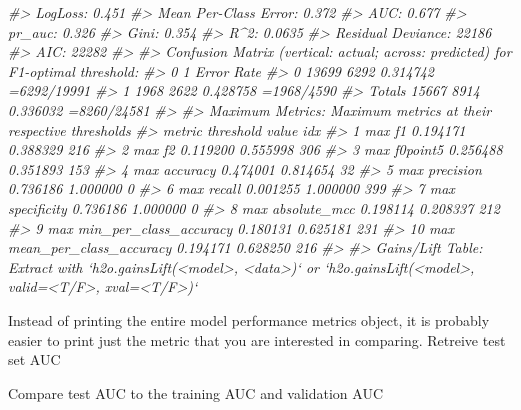 \documentclass[]{book}
\newenvironment{Shaded}{\begin{snugshade}}{\end{snugshade}}
\newcommand{\CommentTok}[1]{\textcolor[rgb]{0.56,0.35,0.01}{\textit{#1}}}
\newcommand{\KeywordTok}[1]{\textcolor[rgb]{0.13,0.29,0.53}{\textbf{#1}}}
\newcommand{\NormalTok}[1]{#1}
\begin{document}
\begin{Shaded}
\begin{Highlighting}[]
\CommentTok{#> LogLoss:  0.451}
\CommentTok{#> Mean Per-Class Error:  0.372}
\CommentTok{#> AUC:  0.677}
\CommentTok{#> pr_auc:  0.326}
\CommentTok{#> Gini:  0.354}
\CommentTok{#> R^2:  0.0635}
\CommentTok{#> Residual Deviance:  22186}
\CommentTok{#> AIC:  22282}
\CommentTok{#> }
\CommentTok{#> Confusion Matrix (vertical: actual; across: predicted) for F1-optimal threshold:}
\CommentTok{#>            0    1    Error         Rate}
\CommentTok{#> 0      13699 6292 0.314742  =6292/19991}
\CommentTok{#> 1       1968 2622 0.428758   =1968/4590}
\CommentTok{#> Totals 15667 8914 0.336032  =8260/24581}
\CommentTok{#> }
\CommentTok{#> Maximum Metrics: Maximum metrics at their respective thresholds}
\CommentTok{#>                         metric threshold    value idx}
\CommentTok{#> 1                       max f1  0.194171 0.388329 216}
\CommentTok{#> 2                       max f2  0.119200 0.555998 306}
\CommentTok{#> 3                 max f0point5  0.256488 0.351893 153}
\CommentTok{#> 4                 max accuracy  0.474001 0.814654  32}
\CommentTok{#> 5                max precision  0.736186 1.000000   0}
\CommentTok{#> 6                   max recall  0.001255 1.000000 399}
\CommentTok{#> 7              max specificity  0.736186 1.000000   0}
\CommentTok{#> 8             max absolute_mcc  0.198114 0.208337 212}
\CommentTok{#> 9   max min_per_class_accuracy  0.180131 0.625181 231}
\CommentTok{#> 10 max mean_per_class_accuracy  0.194171 0.628250 216}
\CommentTok{#> }
\CommentTok{#> Gains/Lift Table: Extract with `h2o.gainsLift(<model>, <data>)` or `h2o.gainsLift(<model>, valid=<T/F>, xval=<T/F>)`}
\end{Highlighting}
\end{Shaded}

Instead of printing the entire model performance metrics object,
it is probably easier to print just the metric that you are interested in comparing.
Retreive test set AUC

\begin{Shaded}
\end{Shaded}

Compare test AUC to the training AUC and validation AUC
\end{document}

